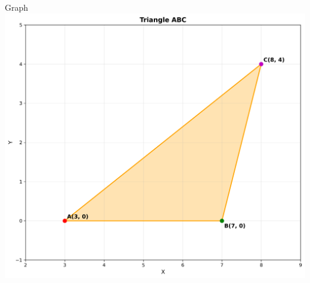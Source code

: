 \documentclass{beamer}
\begin{document}
\begin{frame}{Graph}
   \centering
    \includegraphics[width=\columnwidth, height=0.8\textheight, keepaspectratio]{figs/fig1.png}
    \label{fig:Beamer/figs/fig1.png}
\end{frame}
\end{document}
